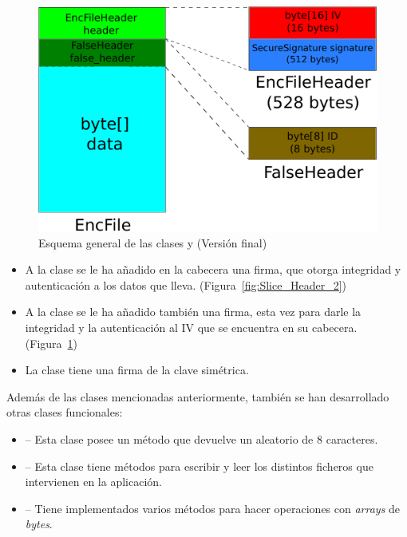 \begin{figure}[!htb]
  \centering
  \includegraphics[scale=0.4]{Figures/EncFile_Header_2}
  \decoRule
  \caption[ -  (Versión final)]{Esquema general de las clases  y  (Versión final)}
  \label{fig:EncFile_Header_2}
\end{figure}

\begin{itemize}
  \item A la clase  se le ha añadido en la cabecera una firma, que otorga integridad y autenticación a los datos que lleva. (Figura~\ref{fig:Slice_Header_2})

  \item A la clase  se le ha añadido también una firma, esta vez para darle la integridad y la autenticación al IV que se encuentra en su cabecera. (Figura~\ref{fig:EncFile_Header_2})

  \item La clase  tiene una firma de la clave simétrica.
\end{itemize}

Además de las clases mencionadas anteriormente, también se han desarrollado otras clases funcionales:

\begin{itemize}
  \item {} -- Esta clase posee un método que devuelve un  aleatorio de 8 caracteres.

  \item {} -- Esta clase tiene métodos para escribir y leer los distintos ficheros que intervienen en la aplicación.

  \item {} -- Tiene implementados varios métodos para hacer operaciones con \emph{arrays} de \emph{bytes}.
\end{itemize}

